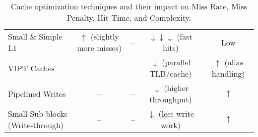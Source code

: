 \begin{landscape}
\begin{table}[p]
\begin{adjustbox}{max width=\linewidth,center}
\begin{tabular}{@{} l c c c c @{}}
            Small \& Simple L1                      & $\uparrow$ (slightly more misses)         & --                                        & $\downarrow\downarrow\downarrow$ (fast hits)  & Low                           \\ [.3em]
            VIPT Caches                             & --                                        & --                                        & $\downarrow$ (parallel TLB/cache)             & $\uparrow$ (alias handling)   \\ [.3em]
            Pipelined Writes                        & --                                        & --                                        & $\downarrow$ (higher throughput)              & $\uparrow$                    \\ [.3em]
            Small Sub-blocks (Write-through)        & --                                        & --                                        & $\downarrow$ (less write work)                & $\uparrow$                    \\
            \bottomrule
            \end{tabular}
        \end{adjustbox}
        \caption{Cache optimization techniques and their impact on Miss Rate, Miss Penalty, Hit Time, and Complexity.}
    \end{table}
\end{landscape}
